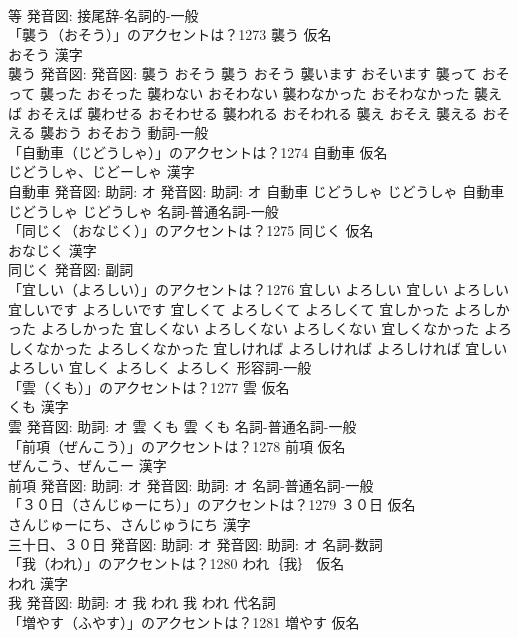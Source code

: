 \documentclass[8pt]{extreport}
\begin{document}
\begin{CJK}{UTF8}{min}
\\	等 発音図:							接尾辞-名詞的-一般 
\\	「襲う（おそう）」のアクセントは？1273	襲う 仮名　
\\	おそう 漢字　
\\	襲う 発音図: 発音図:	襲う おそう		襲う おそう 襲います おそいます 襲って おそって 襲った おそった 襲わない おそわない 襲わなかった おそわなかった 襲えば おそえば 襲わせる おそわせる 襲われる おそわれる 襲え おそえ 襲える おそえる 襲おう おそおう				動詞-一般 
\\	「自動車（じどうしゃ）」のアクセントは？1274	自動車 仮名　
\\	じどうしゃ、じどーしゃ 漢字　
\\	自動車 発音図: 助詞: オ 発音図: 助詞: オ	自動車 じどうしゃ じどうしゃ		自動車 じどうしゃ じどうしゃ				名詞-普通名詞-一般 
\\	「同じく（おなじく）」のアクセントは？1275	同じく 仮名　
\\	おなじく 漢字　
\\	同じく 発音図:							副詞 
\\	「宜しい（よろしい）」のアクセントは？1276		宜しい よろしい		宜しい よろしい 宜しいです よろしいです 宜しくて よろしくて よろしくて 宜しかった よろしかった よろしかった 宜しくない よろしくない よろしくない 宜しくなかった よろしくなかった よろしくなかった 宜しければ よろしければ よろしければ 宜しい よろしい 宜しく よろしく よろしく				形容詞-一般 
\\	「雲（くも）」のアクセントは？1277	雲 仮名　
\\	くも 漢字　
\\	雲 発音図: 助詞: オ	雲 くも		雲 くも				名詞-普通名詞-一般 
\\	「前項（ぜんこう）」のアクセントは？1278	前項 仮名　
\\	ぜんこう、ぜんこー 漢字　
\\	前項 発音図: 助詞: オ 発音図: 助詞: オ							名詞-普通名詞-一般 
\\	「３０日（さんじゅーにち）」のアクセントは？1279	３０日 仮名　
\\	さんじゅーにち、さんじゅうにち 漢字　
\\	三十日、３０日 発音図: 助詞: オ 発音図: 助詞: オ							名詞-数詞 
\\	「我（われ）」のアクセントは？1280	われ｛我｝ 仮名　
\\	われ 漢字　
\\	我 発音図: 助詞: オ	我 われ		我 われ				代名詞 
\\	「増やす（ふやす）」のアクセントは？1281	増やす 仮名　

\end{CJK}
\end{document}
